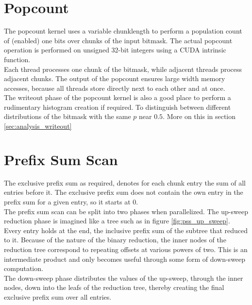 \documentclass{tudscrreprt}
\begin{document}
		\section{Popcount}
			The popcount kernel uses a variable chunklength to perform a population count of (enabled) one bits over chunks of the input bitmask. The actual popcount operation is performed on unsigned 32-bit integers using a CUDA intrinsic function. \\
			Each thread processes one chunk of the bitmask, while adjacent threads process adjacent chunks. The output of the popcount ensures large width memory accesses, because all threads store directly next to each other and at once. \\
			
			The writeout phase of the popcount kernel is also a good place to perform a rudimentary histogram creation if required. To distinguish between different distributions of the bitmask with the same $p$ near $0.5$. More on this in section \ref{sec:analysis_writeout} \\
		
		\section{Prefix Sum Scan}
			The exclusive prefix sum as required, denotes for each chunk entry the sum of all entries before it. The exclusive prefix sum does not contain the own entry in the prefix sum for a given entry, so it starts at 0. \\
			
			The prefix sum scan can be split into two phases when parallelized. The up-sweep reduction phase is imagined like a tree such as in figure \ref{fig:pss_up_sweep}. Every entry holds at the end, the inclusive prefix sum of the subtree that reduced to it. Because of the nature of the binary reduction, the inner nodes of the reduction tree correspond to repeating offsets at various powers of two. This is an intermediate product and only becomes useful through some form of down-sweep computation. \\
			The down-sweep phase distributes the values of the up-sweep, through the inner nodes, down into the leafs of the reduction tree, thereby creating the final exclusive prefix sum over all entries. \\
		
\end{document}
